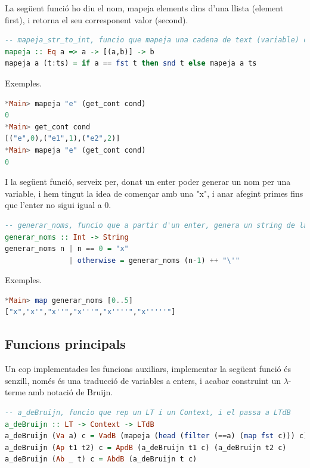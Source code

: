 \documentclass[10pt,a4paper]{article}
\begin{document}
La següent funció ho diu el nom, mapeja elements dins d'una llista (element first), i retorna el seu corresponent valor (second).

\begin{lstlisting}[language=Haskell]
-- mapeja_str_to_int, funcio que mapeja una cadena de text (variable) cap a un enter (posicio o distancia en lambdes)
mapeja :: Eq a => a -> [(a,b)] -> b
mapeja a (t:ts) = if a == fst t then snd t else mapeja a ts
\end{lstlisting}

Exemples.

\begin{lstlisting}[language=Haskell]
*Main> mapeja "e" (get_cont cond)
0
*Main> get_cont cond
[("e",0),("e1",1),("e2",2)]
*Main> mapeja "e" (get_cont cond)
0
\end{lstlisting}

I la següent funció, serveix per, donat un enter poder generar un nom per una variable, i hem tingut la idea de començar amb una "x", i anar afegint primes fins que l'enter no sigui igual a 0.

\begin{lstlisting}[language=Haskell]
-- generar_noms, funcio que a partir d'un enter, genera un string de la forma de: x', on x tindra exactament n primes
generar_noms :: Int -> String
generar_noms n | n == 0 = "x"
               | otherwise = generar_noms (n-1) ++ "\'"
\end{lstlisting}

Exemples.

\begin{lstlisting}[language=Haskell]
*Main> map generar_noms [0..5]
["x","x'","x''","x'''","x''''","x'''''"]
\end{lstlisting}

\clearpage

\subsection{Funcions principals}

Un cop implementades les funcions auxiliars, implementar la següent funció és senzill, només és una traducció de variables a enters, i acabar construint un $\lambda$-terme amb notació de Bruijn.

\begin{lstlisting}[language=Haskell]
-- a_deBruijn, funcio que rep un LT i un Context, i el passa a LTdB
a_deBruijn :: LT -> Context -> LTdB
a_deBruijn (Va a) c = VadB (mapeja (head (filter (==a) (map fst c))) c)
a_deBruijn (Ap t1 t2) c = ApdB (a_deBruijn t1 c) (a_deBruijn t2 c)
a_deBruijn (Ab _ t) c = AbdB (a_deBruijn t c)
\end{lstlisting}
\end{document}
